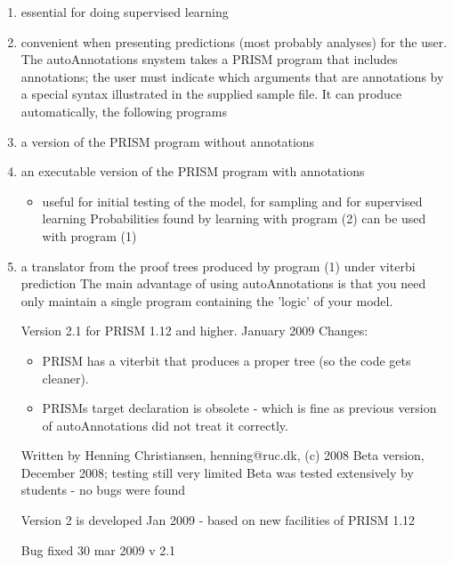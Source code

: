 \begin{enumerate}
    \item essential for doing supervised learning
    \item convenient when presenting predictions (most probably analyses) for the user.
The autoAnnotations snystem takes a PRISM program that includes annotations;
the user must indicate which arguments that are annotations by a special syntax
illustrated in the supplied sample file.
It can produce automatically, the following programs
    \item a version of the PRISM program without annotations


    \item an executable version of the PRISM program with annotations

\begin{itemize}
    \item useful for initial testing of the model, for sampling and for supervised learning
Probabilities found by learning with program (2) can be used with program (1)
\end{itemize}

    \item a translator from the proof trees produced by program (1) under viterbi prediction
The main advantage of using autoAnnotations is that you need only maintain
a single program containing the 'logic' of your model.

Version 2.1 for PRISM 1.12 and higher. January 2009
Changes:

\begin{itemize}
    \item PRISM has a viterbit that produces a proper tree (so the code gets cleaner).
    \item PRISMs target declaration is obsolete - which is fine as previous version of
autoAnnotations did not treat it correctly.
\end{itemize}

Written by Henning Christiansen, henning@ruc.dk, (c) 2008
Beta version, December 2008; testing still very limited
Beta was tested extensively by students - no bugs were found

Version 2 is developed Jan 2009 - based on new facilities of PRISM 1.12

Bug fixed 30 mar 2009 \Sifthen{} v 2.1
\end{enumerate}

